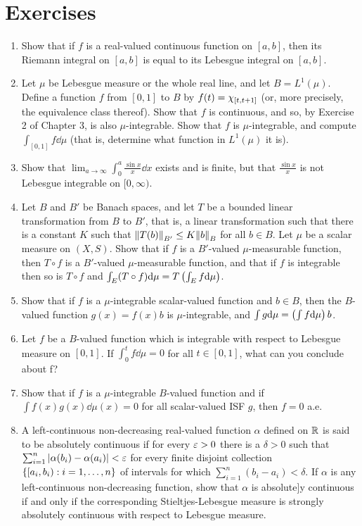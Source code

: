 \section{Exercises}
\begin{enumerate}[label=\arabic*)]
\item Show that if $f$ is a real-valued continuous function on $[a,b]$, then its Riemann integral on $[a,b]$ is equal to its Lebesgue integral on $[a,b]$.

\item Let $\mu$ be Lebesgue measure or the whole real line, and let $B=L^1(\mu)$. Define a function $f$ from $[0,1]$ to $B$ by $f(t)=\chi_{[t, t+1]}$ (or, more precisely, the equivalence class thereof). Show that $f$ is continuous, and so, by Exercise 2 of Chapter 3, is also $\mu$-integrable. Show that $f$ is $\mu$-integrable, and compute $\int_{[0,1]}f\dd\mu$ (that is, determine what function in $L^1(\mu)$ it is).

\item Show that $\lim _{a\to\infty}\int_0^a\frac{\sin x}{x}\dd x$ exists and is finite, but that $\frac{\sin x}{x}$ is not Lebesgue integrable on $[0,\infty)$.

\item Let $B$ and $B'$ be Banach spaces, and let $T$ be a bounded linear transformation from $B$ to $B'$, that is, a linear transformation such that there is a constant $K$ such that $\norm{T(b)}_{B'}\leq K\norm{b}_B$ for all $b\in B$. Let $\mu$ be a scalar measure on $(X,S)$. Show that if $f$ is a $B'$-valued $\mu$-measurable function, then $T\circ f$ is a $B'$-valued $\mu$-measurable function, and that if $f$ is integrable then so is $T\circ f$ and $\int_E(T\circ f)\dd\mu=T\left(\int_Ef\dd\mu\right)$.

\item Show that if $f$ is a $\mu$-integrable scalar-valued function and $b\in B$, then the $B$-valued function $g(x)=f(x)b$ is $\mu$-integrable, and $\int g\dd\mu=\left(\int f\dd\mu\right)b$.

\item Let $f$ be a $B$-valued function which is integrable with respect to Lebesgue measure on $[0,1]$. If $\int_0^t f\dd\mu=0$ for all $t\in[0,1]$, what can you conclude about f?

\item Show that if $f$ is a $\mu$-integrable $B$-valued function and if $\int f(x)g(x)\dd\mu(x)=0$ for all scalar-valued ISF $g$, then $f=0$ a.e.

\item A left-continuous non-decreasing real-valued function $\alpha$ defined on $\mathbb{R}$ is said to be absolutely continuous if for every $\varepsilon>0$ there is a $\delta>0$ such that $\sum_{i=1}^n|\alpha(b_i)-\alpha(a_i)|<\varepsilon$ for every finite disjoint collection $\left\{[a_i, b_i): i=1,\dots, n\right\}$ of intervals for which $\sum_{i=1}^n(b_i-a_i)<\delta$. If $\alpha$ is any left-continuous non-decreasing function, show that $\alpha$ is absolute]y continuous if and only if the corresponding Stieltjes-Lebesgue measure is strongly absolutely continuous with respect to Lebesgue measure.


\end{enumerate}
